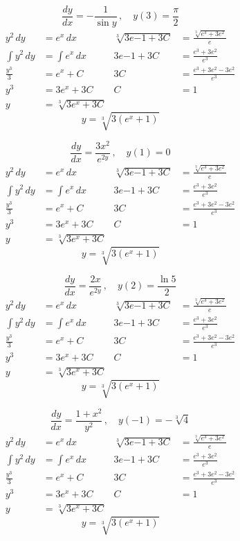 \documentclass[12pt]{article}
\begin{document}
\begin{multicols}{2}
    \begin{center}
    $$\frac{dy}{dx} = -\frac{1}{\sin y}\,, \quad y(3) = \frac{\pi}{2}$$
    \begin{align*}
        y^2\,dy &= e^x\,dx & \sqrt[3]{3e{-1} + 3C} &= \frac{\sqrt[3]{e^3 + 3e^2}}{e} \\
        \int y^2\,dy &= \int e^x\,dx & 3e{-1} + 3C &= \frac{e^3 + 3e^2}{e^3}\\
        \frac{y^3}{3} &= e^x + C & 3C &= \frac{e^3 + 3e^2 - 3e^2}{e^3} \\
        y^3 &= 3e^x + 3C & C &= 1\\
        y &= \sqrt[3]{3e^x + 3C} 
    \end{align*}
    $$y = \sqrt[3]{3(e^x + 1)}$$ 

    $$\frac{dy}{dx} = \frac{3x^2}{e^{2y}}\,, \quad y(1) = 0$$
    \begin{align*}
        y^2\,dy &= e^x\,dx & \sqrt[3]{3e{-1} + 3C} &= \frac{\sqrt[3]{e^3 + 3e^2}}{e} \\
        \int y^2\,dy &= \int e^x\,dx & 3e{-1} + 3C &= \frac{e^3 + 3e^2}{e^3}\\
        \frac{y^3}{3} &= e^x + C & 3C &= \frac{e^3 + 3e^2 - 3e^2}{e^3} \\
        y^3 &= 3e^x + 3C & C &= 1\\
        y &= \sqrt[3]{3e^x + 3C} 
    \end{align*}
    $$y = \sqrt[3]{3(e^x + 1)}$$ 

    \columnbreak 

    $$\frac{dy}{dx} = \frac{2x}{e^{2y}}\,, \quad y(2) = \frac{\ln 5}{2}$$
    \begin{align*}
        y^2\,dy &= e^x\,dx & \sqrt[3]{3e{-1} + 3C} &= \frac{\sqrt[3]{e^3 + 3e^2}}{e} \\
        \int y^2\,dy &= \int e^x\,dx & 3e{-1} + 3C &= \frac{e^3 + 3e^2}{e^3}\\
        \frac{y^3}{3} &= e^x + C & 3C &= \frac{e^3 + 3e^2 - 3e^2}{e^3} \\
        y^3 &= 3e^x + 3C & C &= 1\\
        y &= \sqrt[3]{3e^x + 3C} 
    \end{align*}
    $$y = \sqrt[3]{3(e^x + 1)}$$ 

    $$\frac{dy}{dx} = \frac{1 + x^2}{y^2}\,, \quad y(-1) = -\sqrt[3]{4}$$
    \begin{align*}
        y^2\,dy &= e^x\,dx & \sqrt[3]{3e{-1} + 3C} &= \frac{\sqrt[3]{e^3 + 3e^2}}{e} \\
        \int y^2\,dy &= \int e^x\,dx & 3e{-1} + 3C &= \frac{e^3 + 3e^2}{e^3}\\
        \frac{y^3}{3} &= e^x + C & 3C &= \frac{e^3 + 3e^2 - 3e^2}{e^3} \\
        y^3 &= 3e^x + 3C & C &= 1\\
        y &= \sqrt[3]{3e^x + 3C} 
    \end{align*}
    $$y = \sqrt[3]{3(e^x + 1)}$$ 
    \end{center}
\end{multicols}
\end{document}
